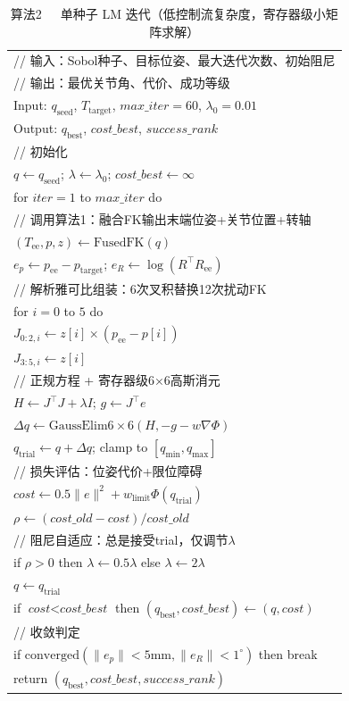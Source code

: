 \documentclass[twocolumn,a4paper,10pt]{ctexart}
\makeatletter
\newenvironment{algotable}[2]{%
  \begin{table}[htbp]
  \centering
  \caption{#2}
  \label{#1}
  \footnotesize\ttfamily
  \begin{tabular}{@{}p{\columnwidth}@{}}
  \toprule
}{%
  \\\bottomrule
  \end{tabular}
  \end{table}
}
\makeatother
\begin{document}
\begin{algotable}{alg:lm}{算法2~~~单种子 LM 迭代（低控制流复杂度，寄存器级小矩阵求解）}
// 输入：Sobol种子、目标位姿、最大迭代次数、初始阻尼\\
// 输出：最优关节角、代价、成功等级\\
Input: $q_{\mathrm{seed}}$, $T_{\mathrm{target}}$, $\textit{max\_iter}{=}60$, $\lambda_0{=}0.01$\\
Output: $q_{\mathrm{best}}$, $\textit{cost\_best}$, $\textit{success\_rank}$\\[2pt]
// 初始化\\
\quad $q\leftarrow q_{\mathrm{seed}}$; $\lambda\leftarrow\lambda_0$; $\textit{cost\_best}\leftarrow\infty$\\
\quad for $\textit{iter}=1$ to $\textit{max\_iter}$ do\\
// 调用算法1：融合FK输出末端位姿+关节位置+转轴\\
\qquad $(T_{\mathrm{ee}},p,z)\leftarrow\mathrm{FusedFK}(q)$\\
\qquad $e_p\leftarrow p_{\mathrm{ee}}-p_{\mathrm{target}}$; $e_R\leftarrow\log(R^\top R_{\mathrm{ee}})$\\
// 解析雅可比组装：6次叉积替换12次扰动FK\\
\qquad for $i=0$ to $5$ do\\
\qquad\quad $J_{0:2,i}\leftarrow z[i]\times(p_{\mathrm{ee}}-p[i])$\\
\qquad\quad $J_{3:5,i}\leftarrow z[i]$\\
// 正规方程 + 寄存器级6×6高斯消元\\
\qquad $H\leftarrow J^\top J+\lambda I$; $g\leftarrow J^\top e$\\
\qquad $\Delta q\leftarrow\mathrm{GaussElim6\times6}(H,-g-w\nabla\Phi)$\\
\qquad $q_{\mathrm{trial}}\leftarrow q+\Delta q$; clamp to $[q_{\min},q_{\max}]$\\
// 损失评估：位姿代价+限位障碍\\
\qquad $\textit{cost}\leftarrow0.5\|e\|^2+w_{\mathrm{limit}}\Phi(q_{\mathrm{trial}})$\\
\qquad $\rho\leftarrow(\textit{cost\_old}-\textit{cost})/\textit{cost\_old}$\\
// 阻尼自适应：总是接受trial，仅调节$\lambda$\\
\qquad if $\rho>0$ then $\lambda\leftarrow0.5\lambda$ else $\lambda\leftarrow2\lambda$\\
\qquad $q\leftarrow q_{\mathrm{trial}}$\\
\qquad if $\textit{cost}<\textit{cost\_best}$ then $(q_{\mathrm{best}},\textit{cost\_best})\leftarrow(q,\textit{cost})$\\
// 收敛判定\\
\qquad if $\mathrm{converged}(\|e_p\|{<}5\mathrm{mm},\|e_R\|{<}1^\circ)$ then break\\
\quad return $(q_{\mathrm{best}},\textit{cost\_best},\textit{success\_rank})$
\end{algotable}
\end{document}
